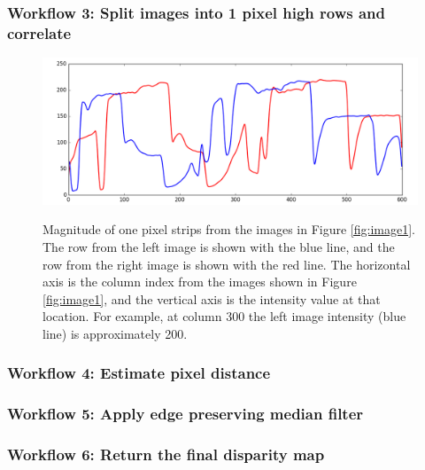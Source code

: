 \documentclass[19pt]{beamer}
\begin{document}
\begin{frame}
\frametitle{Workflow 3: Split images into 1 pixel high rows and correlate}

\begin{figure}[!h]
\centering
\includegraphics[width=1\textwidth]{images/strips.png} \\[2pt]
\caption[Intensity of the one pixel strips taken from the images in Figure \ref{fig:image1}]{Magnitude of one pixel strips from the images in Figure \ref{fig:image1}. The row from the left image is shown with the blue line, and the row from the right image is shown with the red line. The horizontal axis is the column index from the images shown in Figure \ref{fig:image1}, and the vertical axis is the intensity value at that location. For example, at column 300 the left image intensity (blue line) is approximately 200.}
\label{fig:strips}
\end{figure}
\end{frame}


\begin{frame}
\frametitle{Workflow 4: Estimate pixel distance}
\end{frame}


\begin{frame}
\frametitle{Workflow 5: Apply edge preserving median filter}
\end{frame}


\begin{frame}
\frametitle{Workflow 6: Return the final disparity map}
\end{frame}
\end{document}
